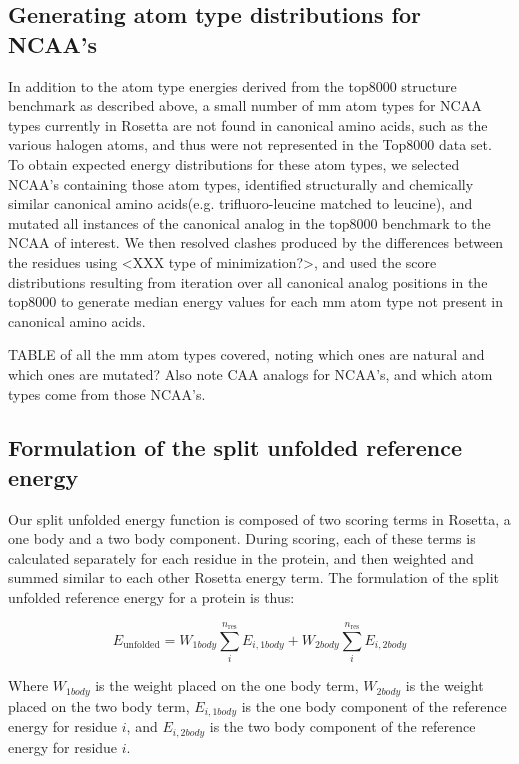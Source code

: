 \subsection{Generating atom type distributions for NCAA's} 
In addition to the atom type energies derived from the top8000 structure benchmark as described above, a small number of mm atom types for NCAA types currently in Rosetta are not found in canonical amino acids, such as the various halogen atoms, and thus were not represented in the Top8000 data set. To obtain expected energy distributions for these atom types, we selected NCAA's containing those atom types, identified structurally and chemically similar canonical amino acids(e.g. trifluoro-leucine matched to leucine), and mutated all instances of the canonical analog in the top8000 benchmark to the NCAA of interest. We then resolved clashes produced by the differences between the residues using <XXX type of minimization?>, and used the score distributions resulting from iteration over all canonical analog positions in the top8000 to generate median energy values for each mm atom type not present in canonical amino acids.

TABLE of all the mm atom types covered, noting which ones are natural and which ones are mutated? Also note CAA analogs for NCAA's, and which atom types come from those NCAA's.


\subsection{Formulation of the split unfolded reference energy}
Our split unfolded energy function is composed of two scoring terms in Rosetta, a one body and a two body component. During scoring, each of these terms is calculated separately for each residue in the protein, and then weighted and summed similar to each other Rosetta energy term. The formulation of the split unfolded reference energy for a protein is thus:

\begin{equation}
E_{\text{unfolded}} =  W_{1body} \sum_{i}^{n_{\text{res}}} E_{i,1body} +  W_{2body} \sum_{i}^{n_{\text{res}}} E_{i,2body}
\end{equation}

Where $W_{1body}$ is the weight placed on the one body term, $W_{2body}$ is the weight placed on the two body term, $E_{i,1body}$ is the one body component of the reference energy for residue $i$, and $E_{i,2body}$ is the two body component of the reference energy for residue $i$.


